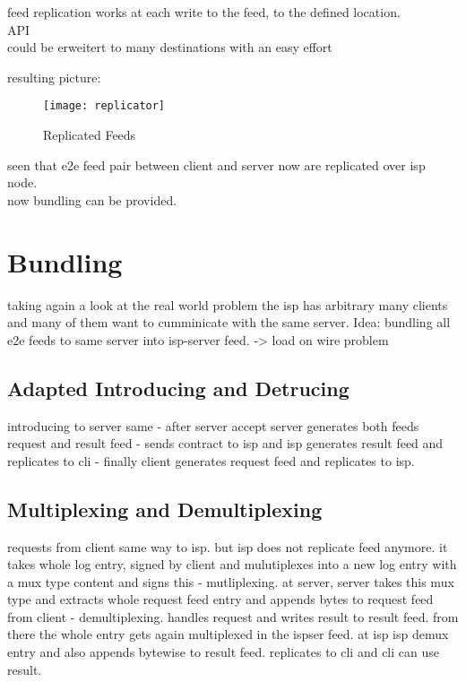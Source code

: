 feed replication works at each write to the feed, to the  defined location.\\

API\\

could be erweitert to many destinations with an easy effort

resulting picture:
\begin{figure}
    \centering
    \texttt{[image: replicator]}
    \caption{Replicated Feeds}
    \label{fig:replication}
\end{figure}

seen that e2e feed pair between client and server now are replicated over isp node.\\ 
now bundling can be provided.

\section{Bundling}
taking again a look at the real world problem the isp has arbitrary many clients and many of them want to cumminicate with the same server. Idea: bundling all e2e feeds to same server into isp-server feed.
-> load on wire problem

\subsection{Adapted Introducing and Detrucing}
introducing to server same - after server accept server generates both feeds request and result feed - sends contract to isp and isp generates result feed and replicates to cli - finally client generates request feed and replicates to isp.


\subsection{Multiplexing and Demultiplexing}
requests from client same way to isp. but isp does not replicate feed anymore. it takes whole log entry, signed by client and mulutiplexes into a new log entry with a mux type content and signs this - mutliplexing. at server, server takes this mux type and extracts whole request feed entry and appends bytes to request feed from client - demultiplexing. handles request and writes result to result feed. from there the whole entry gets again multiplexed in the ispser feed. at isp isp demux entry and also appends bytewise to result feed. replicates to cli and cli can use result.

